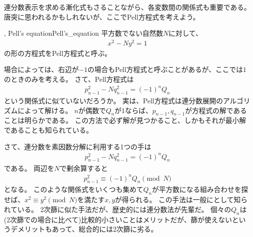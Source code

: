 
連分数表示を求める漸化式もさることながら、各変数間の関係式も重要である。
唐突に思われるかもしれないが、ここでPell方程式を考えよう。

\begin{Defi}{, Pell's equation}{Pell's_equation}
平方数でない自然数$N$に対して、
\begin{align*}
x^2 - Ny^2 = 1
\end{align*}
の形の方程式をPell方程式と呼ぶ。
\end{Defi}

場合によっては、右辺が$-1$の場合もPell方程式と呼ぶことがあるが、ここでは$1$のときのみを考える。
さて、Pell方程式は
\begin{align*}
p_{n-1}^2 - N q_{n-1}^2 = (-1)^n Q_n
\end{align*}
という関係式に似ていないだろうか。
実は、Pell方程式は連分数展開のアルゴリズムによって解ける。
$n$が偶数で$Q_n$が1ならば、$p_{n-1},q_{n-1}$が方程式の解であることは明らかである。
この方法で必ず解が見つかること、しかもそれが最小解であることも知られている。


さて、連分数を素因数分解に利用する1つの手は
\begin{align*}
p_{n-1}^2 - N q_{n-1}^2 = (-1)^n Q_n
\end{align*}
である。
両辺を$N$で剰余算すると
\begin{align*}
p_{n-1}^2 \equiv (-1)^n Q_n \pmod{N}
\end{align*}
となる。
このような関係式をいくつも集めて$Q_n$が平方数になる組み合わせを探せば、$x^2\equiv y^2\pmod{N}$を満たす$x,y$が得られる。
この手法は一般にとして知られている。
2次篩に似た手法だが、歴史的には連分数法が先輩だ。
個々の$Q_n$は(2次篩での場合に比べて)比較的小さいことはメリットだが、篩が使えないというデメリットもあって、総合的には2次篩に劣る。
